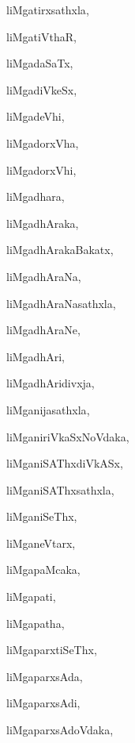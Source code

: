 \begin{multicols}{3}
{\noindent
{liMgatirxsathxla}, \pageref{liMgatirxsathxla}

\noindent
{liMgatiVthaR}, \pageref{liMgatiVthaR}

\noindent
{liMgadaSaTx}, \pageref{liMgadaSaTx}

\noindent
{liMgadiVkeSx}, \pageref{liMgadiVkeSx}

\noindent
{liMgadeVhi}, \pageref{liMgadeVhi}

\noindent
{liMgadorxVha}, \pageref{liMgadorxVha}

\noindent
{liMgadorxVhi}, \pageref{liMgadorxVhi}

\noindent
{liMgadhara}, \pageref{liMgadhara}

\noindent
{liMgadhAraka}, \pageref{liMgadhAraka}

\noindent
{liMgadhArakaBakatx}, \pageref{liMgadhArakaBakatx}

\noindent
{liMgadhAraNa}, \pageref{liMgadhAraNa}

\noindent
{liMgadhAraNasathxla}, \pageref{liMgadhAraNasathxla}

\noindent
{liMgadhAraNe}, \pageref{liMgadhAraNe}

\noindent
{liMgadhAri}, \pageref{liMgadhAri}

\noindent
{liMgadhAridivxja}, \pageref{liMgadhAridivxja}

\noindent
{liMganijasathxla}, \pageref{liMganijasathxla}

\noindent
{liMganiriVkaSxNoVdaka}, \pageref{liMganiriVkaSxNoVdaka}

\noindent
{liMganiSAThxdiVkASx}, \pageref{liMganiSAThxdiVkASx}

\noindent
{liMganiSAThxsathxla}, \pageref{liMganiSAThxsathxla}

\noindent
{liMganiSeThx}, \pageref{liMganiSeThx}

\noindent
{liMganeVtarx}, \pageref{liMganeVtarx}

\noindent
{liMgapaMcaka}, \pageref{liMgapaMcaka}

\noindent
{liMgapati}, \pageref{liMgapati}

\noindent
{liMgapatha}, \pageref{liMgapatha}

\noindent
{liMgaparxtiSeThx}, \pageref{liMgaparxtiSeThx}

\noindent
{liMgaparxsAda}, \pageref{liMgaparxsAda}

\noindent
{liMgaparxsAdi}, \pageref{liMgaparxsAdi}

\noindent
{liMgaparxsAdoVdaka}, \pageref{liMgaparxsAdoVdaka}

}
\end{multicols}
